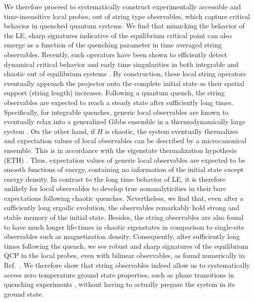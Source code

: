 \documentclass[aps,prx,twocolumn]{revtex4-2}
\begin{document}
We therefore proceed to systematically construct experimentally accessible and time-insensitive local probes, out of string type observables, which capture critical behavior in quenched quantum systems. We find that mimicking the behavior of the LE,  {sharp signatures indicative of the equilibrium critical point can also emerge as a function of the quenching parameter in time averaged string observables}. Recently, such operators have been shown to efficiently detect dynamical critical behavior and early time singularities in both integrable and chaotic out of equilibrium systems \cite{jurcevic17,jad21,pol21}. By construction, these local string operators eventually approach the projector onto the complete initial state as their spatial support (string length) increases.  {Following a quantum quench, the string observables are expected to reach a  {steady state} after sufficiently long times.} Specifically, for integrable quenches,  {generic} local observables are known to eventually relax into a generalized Gibbs ensemble in a thermodynamically large system \cite{rigol_gge07,das_gge16}. On the other hand, if $H$ is chaotic, the system eventually thermalizes and expectation values of local observables can be described by a microcanonical ensemble. This is in accordance with the eigenstate thermalization hypothesis (ETH) \cite{srednicki99,Rigol2008_review,luca16,Russomanno21}.  Thus, expectation values of generic local observables are expected to be smooth functions of energy, containing no information of the initial state \cite{alba19} except energy density. In contrast to the long time behavior of LE, it is therefore unlikely for local observables to develop true nonanalyticities in their bare expectations following chaotic quenches. Nevertheless, we find that, even after a sufficiently long ergodic evolution, the observables remarkably hold strong and stable memory of the initial state. Besides, the string observables are also found to have much longer life-times in chaotic eigenstates in comparison to single-site observables such as magnetization density. Consequently, after  {sufficiently long} times following the quench, we see robust and sharp signatures of the equilibrium QCP in the local probes, even with bilinear observables, as found numerically in Ref.~\cite{asmi21}. We therefore show that string observables indeed allow us to systematically access zero temperature ground state properties, such as phase transitions in quenching experiments \cite{Zhang2017}, without having to actually prepare the system in its ground state. \\
\end{document}
